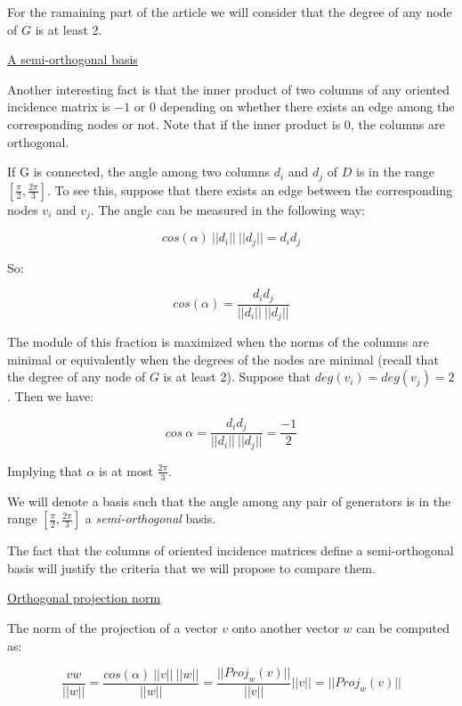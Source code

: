 \documentclass[a4paper,11pt]{article}
\begin{document}
\bigskip

For the ramaining part of the article we will consider that the degree 
of any node of $G$ is at least 2.

\bigskip

\underline{A semi-orthogonal basis}

\bigskip

Another interesting fact is that the inner product of two columns of any 
oriented incidence matrix is $-1$ or $0$ depending on whether there exists an 
edge among the corresponding nodes or not. Note that if the inner 
product is $0$, the columns are orthogonal.

\bigskip

If G is connected, the angle among two columns $d_i$ and $d_j$ of $D$ is 
in the range $[\frac{\pi}{2},\frac{2\pi}{3}]$. To see this, suppose that there exists 
an edge between the corresponding nodes $v_i$ and $v_j$. The angle can be 
measured in the following way:

$$cos(\alpha) \ ||d_i|| \ ||d_j||= d_i  d_j$$

So: 

$$cos(\alpha) = \frac{d_i d_j}{||d_i|| \ ||d_j||}$$

The module of this fraction is maximized when the norms of the columns 
are minimal or equivalently when the degrees of the nodes are minimal 
(recall that the degree of any node of $G$ is at least 2). Suppose that 
$deg(v_i) = deg(v_j) = 2$. Then we have:

$$cos \ \alpha = \frac{d_i d_j}{||d_i|| \ ||d_j||} = \frac{-1}{2}$$

\bigskip

Implying that $\alpha$ is at most $\frac{2\pi}{3}$.

\bigskip

We will denote a basis such that the angle among any pair of generators 
is in the range $[\frac{\pi}{2},\frac{2\pi}{3}]$ a \textit{semi-orthogonal} 
basis.

\bigskip

The fact that the columns of oriented incidence matrices define a 
semi-orthogonal basis will justify the criteria that we will propose to 
compare them. 

\bigskip

\underline{Orthogonal projection norm}

\bigskip
The norm of the projection of a vector $v$ onto another vector $w$ can 
be computed as:

$$\frac{v w}{||w||} = \frac{cos(\alpha) \ ||v|| \ ||w||}{||w||} = \frac{||Proj_w(v)||}{||v||} ||v|| = ||Proj_w(v)||$$
\end{document}
